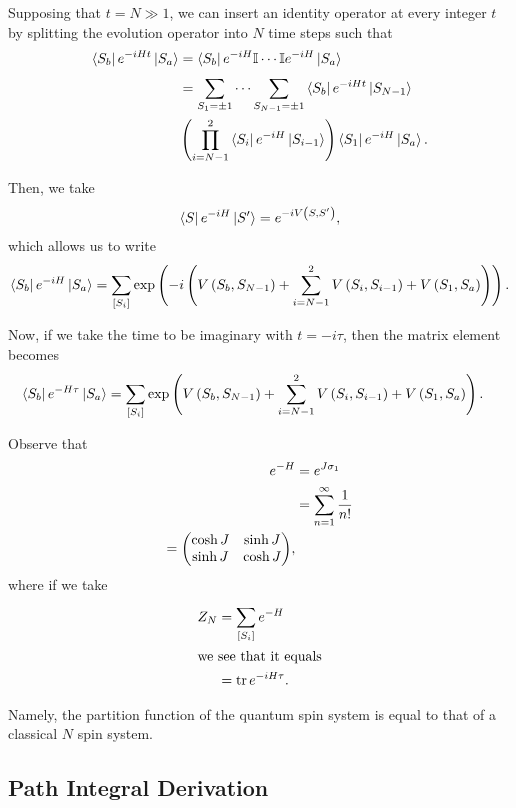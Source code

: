 Supposing that $t = N \gg 1$, we can insert an identity operator at every  integer $t$ by splitting the evolution operator into $N$ time steps such that
\begin{align*}
    \bra{S_b} e^{-i H t} \ket{S_a} &= \bra{S_b} e^{-iH}\mathbb{I} \cdots \mathbb{I} e^{-iH} \ket{S_a} \\
    &=  \sum_{S_1=\pm 1}^{} \cdots \sum_{S_{N-1}=\pm 1}^{} \bra{S_b} e^{-i H t} \ket{S_{N-1}} \\
                                   &\left( \prod_{i=N-1}^{2} \bra{S_{i}} e^{-iH} \ket{S_{i-1}} \right) \bra{S_1} e^{-iH} \ket{S_a}
.\end{align*}

Then, we take
\begin{align*}
    \bra{S} e^{-iH} \ket{S'} = e^{-i V\left( S,S' \right) }
,\end{align*}
which allows us to write
\begin{align*}
    \bra{S_b} e^{-iH} \ket{S_a} = \sum_{[S_i]} \exp \left( -i \left( V\left( S_b, S_{N-1} \right) +  \sum_{i=N-1}^{2} V\left( S_i, S_{i-1} \right) + V\left( S_1, S_a \right)  \right)   \right) 
.\end{align*}

Now, if we take the time to be imaginary with $t = -i \tau$, then the matrix element becomes
\begin{align*}
    \bra{S_b} e^{-H \tau} \ket{S_a} &= \sum_{[S_i]} \exp \left(  V\left( S_b, S_{N-1} \right) +  \sum_{i=N-1}^{2} V\left( S_i, S_{i-1} \right) + V\left( S_1, S_a \right)  \right)
.\end{align*}

Observe that
\begin{align*}
    e^{-H} &= e^{J \sigma_1}  \\
    &= \sum_{n =1}^{\infty} \frac{1}{n!} \\
    = \mqty( \cosh J & \sinh J \\ \sinh J & \cosh J)
,\end{align*}
where if we take
\begin{align*}
    Z_N &= \sum_{[S_i]}^{} e^{-H} \\
    \intertext{we see that it equals}
    &= \tr e^{-i H \tau}
.\end{align*}

Namely, the partition function of the quantum spin system is equal to that of a classical $N$ spin system.

\subsection{Path Integral Derivation}

